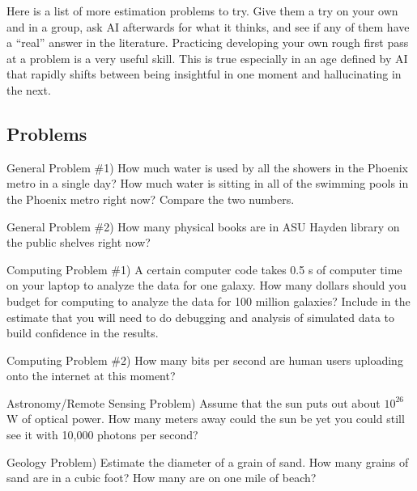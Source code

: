 \documentclass[12pt]{article}
\begin{document}
Here is a list of more estimation problems to try. Give them a try on your own and in a group, ask AI afterwards for what it thinks, and see if any of them have a ``real'' answer in the literature. Practicing developing your own rough first pass at a problem is a very useful skill. This is true especially in an age defined by AI that rapidly shifts between being insightful in one moment and hallucinating in the next.

\subsection{Problems}
\indent \indent General Problem \#1) How much water is used by all the showers in the Phoenix metro in a single day? How much water is sitting in all of the swimming pools in the Phoenix metro right now? Compare the two numbers.

General Problem \#2) How many physical books are in ASU Hayden library on the public shelves right now?

Computing Problem \#1) A certain computer code takes 0.5 s of computer time on your laptop to analyze the data for one galaxy. How many dollars should you budget for computing to analyze the data for 100 million galaxies? Include in the estimate that you will need to do debugging and analysis of simulated data to build confidence in the results.

Computing Problem \#2) How many bits per second are human users uploading onto the internet at this moment?

Astronomy/Remote Sensing Problem) Assume that the sun puts out about $10^{26}$ W of optical power. How many meters away could the sun be yet you could still see it with 10,000 photons per second?

Geology Problem) Estimate the diameter of a grain of sand. How many grains of sand are in a cubic foot? How many are on one mile of beach?
\end{document}
